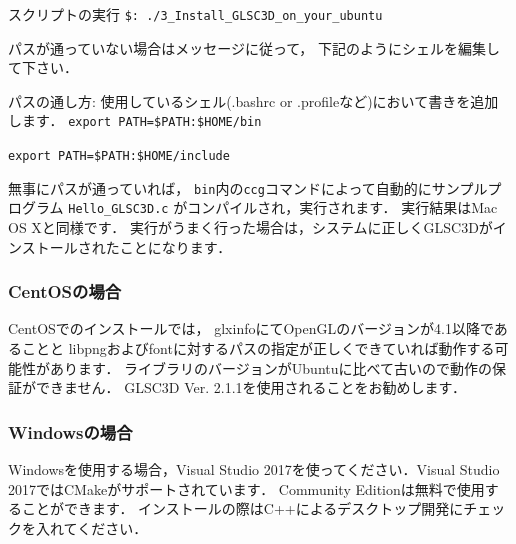 \documentclass[platex,a4paper,12pt]{jsarticle}%
\begin{document}
\begin{itembox}[l]{スクリプトの実行}
\verb|$: ./3_Install_GLSC3D_on_your_ubuntu|
\end{itembox}

パスが通っていない場合はメッセージに従って，
下記のようにシェルを編集して下さい．

\begin{itembox}[l]{パスの通し方: 使用しているシェル(.bashrc or .profileなど)において書きを追加します．}
\verb|export PATH=$PATH:$HOME/bin|
	
\verb|export PATH=$PATH:$HOME/include|
\end{itembox}

無事にパスが通っていれば，
\verb|bin|内の\verb|ccg|コマンドによって自動的にサンプルプログラム \verb|Hello_GLSC3D.c| がコンパイルされ，実行されます．
実行結果はMac OS Xと同様です．
実行がうまく行った場合は，システムに正しくGLSC3Dがインストールされたことになります．

\subsubsection{CentOSの場合}

CentOSでのインストールでは，
glxinfoにてOpenGLのバージョンが4.1以降であることと
libpngおよびfontに対するパスの指定が正しくできていれば動作する可能性があります．
ライブラリのバージョンがUbuntuに比べて古いので動作の保証ができません．
GLSC3D Ver. 2.1.1を使用されることをお勧めします．


\subsubsection{Windowsの場合}

Windowsを使用する場合，Visual Studio 2017を使ってください．Visual Studio 2017ではCMakeがサポートされています．
Community Editionは無料で使用することができます．
インストールの際はC++によるデスクトップ開発にチェックを入れてください．
\end{document}
